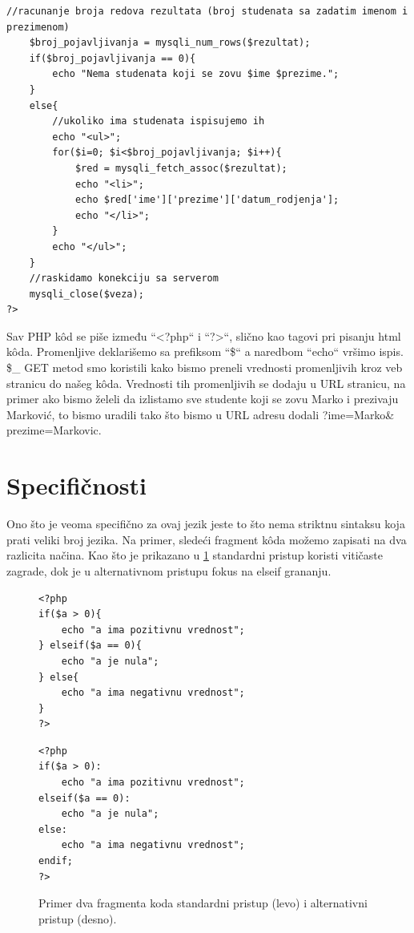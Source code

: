 \documentclass[a4paper]{article}
\begin{document}
{\begin{lstlisting}[caption={Primer PHP k\^{o}da},frame=single, label=primer_koda]
	//racunanje broja redova rezultata (broj studenata sa zadatim imenom i prezimenom)
	$broj_pojavljivanja = mysqli_num_rows($rezultat);
	if($broj_pojavljivanja == 0){
		echo "Nema studenata koji se zovu $ime $prezime.";	
	}
	else{
		//ukoliko ima studenata ispisujemo ih	
		echo "<ul>";
		for($i=0; $i<$broj_pojavljivanja; $i++){
			$red = mysqli_fetch_assoc($rezultat);
			echo "<li>";
			echo $red['ime']['prezime']['datum_rodjenja'];
			echo "</li>";		
		}
		echo "</ul>";
	}
	//raskidamo konekciju sa serverom
	mysqli_close($veza);
?>
\end{lstlisting}
Sav PHP k\^{o}d se piše između “<?php“ i “?>“, slično kao tagovi pri pisanju html k\^{o}da. Promenljive deklarišemo sa prefiksom “\$“ a naredbom “echo“ vršimo ispis. \$\_ GET metod smo koristili kako bismo preneli vrednosti promenljivih kroz veb stranicu do našeg k\^{o}da. Vrednosti tih promenljivih se dodaju u URL stranicu, na primer ako bismo želeli da izlistamo sve studente koji se zovu Marko i prezivaju Marković, to bismo uradili tako što bismo u URL adresu dodali ?ime=Marko\& prezime=Markovic.

\section{Specifičnosti}

Ono što je veoma specifično za ovaj jezik jeste to što nema striktnu sintaksu koja prati veliki broj jezika. Na primer, sledeći fragment k\^{o}da možemo zapisati na dva razlicita načina. Kao što je prikazano u \ref{fig:stand_alt} standardni pristup koristi vitičaste zagrade, dok je u alternativnom pristupu fokus na elseif grananju. 

\begin{figure}[h]
		\centering
		\begin{minipage}{0.35\textwidth}
\begin{lstlisting}
<?php
if($a > 0){
	echo "a ima pozitivnu vrednost";
} elseif($a == 0){
	echo "a je nula";	
} else{
	echo "a ima negativnu vrednost";	
}
?>	
\end{lstlisting}
		\end{minipage}
		\hfill
		\begin{minipage}{0.35\textwidth}
\begin{lstlisting}
<?php
if($a > 0):
	echo "a ima pozitivnu vrednost";
elseif($a == 0):
	echo "a je nula";	
else:
	echo "a ima negativnu vrednost";	
endif;
?>	
\end{lstlisting}
		\end{minipage}
		\caption{Primer dva fragmenta koda standardni pristup (levo) i alternativni pristup (desno).}
		\label{fig:stand_alt}
\end{figure}



}
\end{document}
